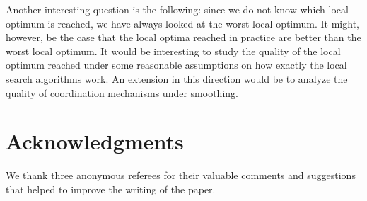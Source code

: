 \documentclass[a4paper,11pt,fleqn]{article}
\begin{document}
Another interesting question is the following:
since we do not know which local optimum is reached, we have always looked at
the worst local optimum. It might, however, be the case that the local optima
reached in practice are better than the worst local optimum. It would be interesting
to study the quality of the local optimum reached under some reasonable assumptions on how
exactly the local search algorithms work. An extension in this direction would be 
to analyze the quality of coordination mechanisms under smoothing.

\section*{Acknowledgments}
We thank three anonymous referees for their valuable comments and suggestions 
that helped to improve the writing of the paper.
\end{document}
